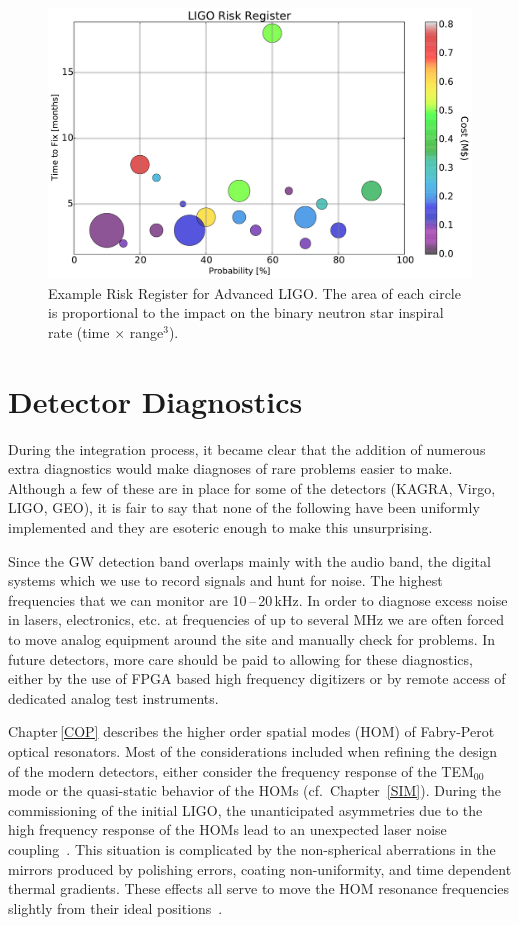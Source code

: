 \begin{figure}[h]
  \centering
\includegraphics[width=\columnwidth]{Figures/Risk.pdf}
  \caption{Example Risk Register for Advanced LIGO. The area of each circle is
  proportional to the impact on the binary neutron star inspiral rate
  (time $\times$ range$^3$).}
  \label{fig:RiskBubbles}
\end{figure}


\section{Detector Diagnostics}
\label{s:IDC:diagnostics}
During the integration process, it became clear that the addition of numerous
extra diagnostics would make diagnoses of rare problems easier to make. Although
a few of these are in place for some of the detectors (KAGRA, Virgo, LIGO, GEO),
it is fair to say that none of the following have been uniformly implemented and
they are esoteric enough to make this unsurprising.

Since the GW detection band overlaps mainly with the audio band, the
    digital systems which we use to record signals and hunt for noise. The highest
    frequencies that we can monitor are 10\,--\,20\,kHz. In order to diagnose
    excess noise in lasers, electronics, etc. at frequencies of up to several
    MHz we are often forced to move analog equipment around the site and manually
    check for problems. In future detectors, more care should be paid to allowing
    for these diagnostics, either by the use of FPGA based high frequency
    digitizers or by remote access of dedicated analog test instruments.

Chapter\,\ref{COP} describes the higher order spatial modes (HOM) of
    Fabry-Perot optical resonators. Most of the considerations included when
    refining the design of the modern detectors, either consider the frequency
    response of the TEM$_{00}$ mode or the quasi-static behavior of the
    HOMs (cf.~Chapter~\ref{SIM}). During the commissioning
    of the initial LIGO, the unanticipated asymmetries due to the high frequency
    response of the HOMs lead to an unexpected laser noise coupling~\cite{Stefan:Thesis}.
    This situation is complicated by the non-spherical aberrations in the mirrors
    produced by polishing errors, coating non-uniformity, and time dependent
    thermal gradients. These effects all serve to move the HOM resonance frequencies
    slightly from their ideal positions~\cite{Siegman:Lasers}.

